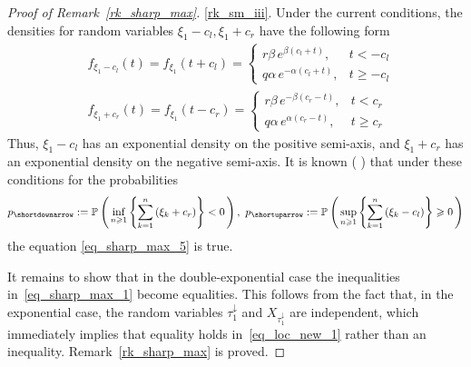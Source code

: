 \documentclass{article}
\theoremstyle{plain}
\theoremstyle{definition}
\theoremstyle{remark}
\newcommand{\p}[2][]{{\mathbb{P}}_{#1} \left( \, #2 \, \right) } %
\newcommand{\skk}[1]{\left\{ #1 \right\}} %
\begin{document}
\begin{proof}[Proof of Remark~\ref{rk_sharp_max}]
\ref{rk_sm_iii}. Under the current conditions, the densities for random variables $\xi_1 - c_l, \xi_1 + c_r$ have the following form
\begin{equation*}
\begin{split}
& f_{\xi_1 - c_l}(t)=f_{\xi_1}\left(t + c_l\right)=\left\{\begin{array}{lc}
r \beta\, e^{\beta \left(c_l + t\right)}, & t<-c_l \\
q \alpha \,e^{-\alpha (c_l+  t)}, & t \geq-c_l
\end{array}\right. \\
& f_{\xi_1 + c_r}(t)=f_{\xi_1}\left(t - c_r\right)=\left\{\begin{array}{lc}
r \beta \, e^{-\beta (c_r - t)}, & t < c_r \\
q \alpha \, e^{\alpha (c_r - t)}, & t \geqslant c_r
\end{array}\right. 
\end{split}
\end{equation*}
Thus, $\xi_1 - c_l$ has an exponential density on the positive semi-axis, and $\xi_1 + c_r$ has an exponential density on the negative semi-axis. It is known (\citet[Ch.12, Example 5.1]{Borovkov:20013} ) that under these conditions for the probabilities 
\begin{equation*}
 p_{\shortdownarrow}:= \p{\inf\limits_{n \geqslant 1} \skk{\sum\limits_{k=1}^n \left(\xi_k +c_r\right)} < 0}, \ p_{\shortuparrow}:=\p{\sup\limits_{n\geqslant 1} \skk{\sum\limits_{k=1}^n \left(\xi_k -c_l\right)} \geqslant 0}
\end{equation*}
the equation \eqref{eq_sharp_max_5} is true. 

It remains to show that in the double-exponential case the inequalities in~\eqref{eq_sharp_max_1} become equalities. This follows from the fact that, in the exponential case, the random variables $\tau_1^{\downarrow}$ and $X_{\tau_1^{\downarrow}}$ are independent, which immediately implies that equality holds in~\eqref{eq_loc_new_1} rather than an inequality. Remark~\ref{rk_sharp_max} is proved. 
\end{proof}  
\end{document}
